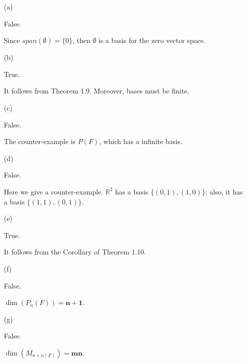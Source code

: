 \begin{Exercise}
	\begin{enumerate}[(a)]
		\item[(a)]
		\begin{answer}
			False.
		\end{answer}
		\begin{solution}
			Since $span(\emptyset)=\{0\}$, then $\emptyset$ is a basis for the zero vector space.
		\end{solution}
		
		\item[(b)]
		\begin{answer}
			True.
		\end{answer}
		\begin{solution}
			It follows from Theorem 1.9. Moreover, bases must be finite.
		\end{solution}
		
		\item[(c)]
		\begin{answer}
			False.
		\end{answer}
		\begin{solution}
			The counter-example is $P(F)$, which has a infinite basis.
		\end{solution}
		
		\item[(d)]
		\begin{answer}
			False.
		\end{answer}
		\begin{solution}
			Here we give a counter-example. $\mathbb{R}^2$ has a basis $\{(0,1), (1,0)\}$; also, it has a basis $\{(1,1),(0,1)\}$.
		\end{solution}
		
		\item[(e)]
		\begin{answer}
			True.
		\end{answer}
		\begin{solution}
			It follows from the Corollary of Theorem 1.10.
		\end{solution}
		
		\item[(f)]
		\begin{answer}
			False.
		\end{answer}
		\begin{solution}
			$\dim\left(P_n(F)\right) = \mathbf{n+1}$.
		\end{solution}
		
		\item[(g)]
		\begin{answer}
			False.
		\end{answer}
		\begin{solution}
			$\dim\left(M_{n\times n(F)}\right) = \mathbf{m n}$.
		\end{solution}
		

\end{enumerate}
\end{Exercise}
